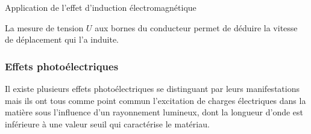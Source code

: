 \begin{exemple}{Application de l'effet d'induction électromagnétique}{}
\begin{figure}[H]
\end{figure}
La mesure de tension $U$ aux bornes du conducteur permet de déduire la vitesse de déplacement qui l'a induite.
\end{exemple}


\subsubsection{Effets photoélectriques}

Il existe plusieurs effets photoélectriques se distinguant par leurs manifestations mais ils ont tous comme point commun l'excitation de charges électriques dans la matière sous l'influence d'un rayonnement lumineux, dont la longueur d'onde est inférieure à une valeur seuil qui caractérise le matériau.

